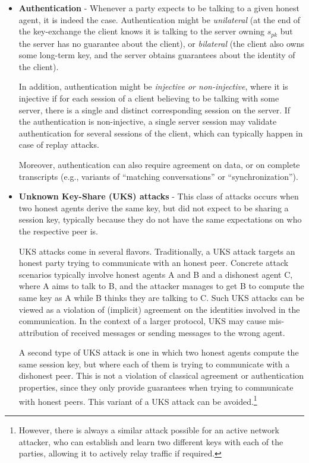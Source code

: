 \documentclass[11pt]{article}
\newcommand{\sfpk}{\mathit{pk}}
\begin{document}
\begin{itemize}
\item \textbf{Authentication} - Whenever a party expects to be talking to a given honest agent, it is indeed the case. Authentication might be \emph{unilateral} (at the end of the key-exchange the client knows it is talking to  the server owning $s_\sfpk$ but the server has no guarantee about the client), or \emph{bilateral} (the client also owns some long-term key, and the server obtains guarantees about the identity of the client). 

In addition, authentication might be \emph{injective or non-injective}, where it is injective if for each session of a client believing to be talking with some server, there is a single and distinct corresponding session on the server. If the authentication is non-injective, a single server session may validate authentication for several sessions of the client, which can typically happen in case of replay attacks. 

Moreover, authentication can also require agreement on data, or on complete transcripts (e.g., variants of ``matching conversations'' or ``synchronization'').
  \item \textbf{Unknown Key-Share (UKS) attacks} -  This class of attacks occurs when two honest agents derive the same key, but did not expect to be sharing a session key, typically because they do not have the same expectations on who the respective peer is.
  
  UKS attacks come in several flavors. Traditionally, a UKS attack targets an honest party trying to communicate with an honest peer. 
  Concrete attack scenarios typically involve honest agents A and B and a dishonest agent C, where A aims to talk to B, and the attacker manages to get B to compute the same key as A while B thinks they are talking to C.  Such UKS attacks can be viewed as a violation of (implicit) agreement on the identities involved in the communication. In the context of a larger protocol, UKS may cause mis-attribution of received messages or sending messages to the wrong agent.

  A second type of UKS attack is one in which two honest agents compute the same session key, but where each of them is trying to communicate with a dishonest peer.
  This is not a violation of classical agreement or authentication properties, since they only provide guarantees when trying to communicate with honest peers. 
  This variant of a UKS attack can be avoided.\footnote{However, there is always a similar attack possible for an active network attacker, who can establish and learn two different keys with each of the parties, allowing it to actively relay traffic if required.}


\end{itemize}
\end{document}
